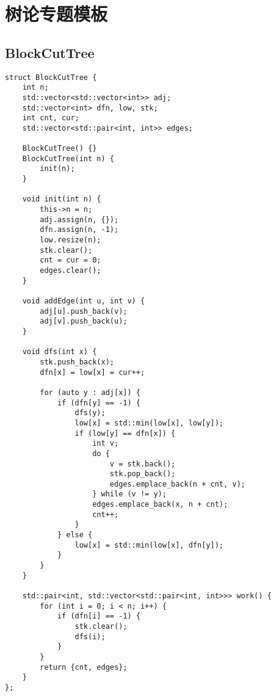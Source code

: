 \section{树论专题模板}
\subsection{BlockCutTree}
\begin{lstlisting}
struct BlockCutTree {
    int n;
    std::vector<std::vector<int>> adj;
    std::vector<int> dfn, low, stk;
    int cnt, cur;
    std::vector<std::pair<int, int>> edges;
    
    BlockCutTree() {}
    BlockCutTree(int n) {
        init(n);
    }
    
    void init(int n) {
        this->n = n;
        adj.assign(n, {});
        dfn.assign(n, -1);
        low.resize(n);
        stk.clear();
        cnt = cur = 0;
        edges.clear();
    }
    
    void addEdge(int u, int v) {
        adj[u].push_back(v);
        adj[v].push_back(u);
    }
    
    void dfs(int x) {
        stk.push_back(x);
        dfn[x] = low[x] = cur++;
        
        for (auto y : adj[x]) {
            if (dfn[y] == -1) {
                dfs(y);
                low[x] = std::min(low[x], low[y]);
                if (low[y] == dfn[x]) {
                    int v;
                    do {
                        v = stk.back();
                        stk.pop_back();
                        edges.emplace_back(n + cnt, v);
                    } while (v != y);
                    edges.emplace_back(x, n + cnt);
                    cnt++;
                }
            } else {
                low[x] = std::min(low[x], dfn[y]);
            }
        }
    }
    
    std::pair<int, std::vector<std::pair<int, int>>> work() {
        for (int i = 0; i < n; i++) {
            if (dfn[i] == -1) {
                stk.clear();
                dfs(i);
            }
        }
        return {cnt, edges};
    }
};
\end{lstlisting}



